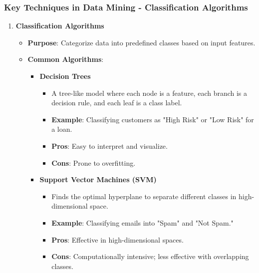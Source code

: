 \documentclass[aspectratio=169]{beamer}
\begin{document}
\begin{frame}[fragile]
    \frametitle{Key Techniques in Data Mining - Classification Algorithms}
    \begin{enumerate}
        \item \textbf{Classification Algorithms}
        \begin{itemize}
            \item \textbf{Purpose}: Categorize data into predefined classes based on input features.
            \item \textbf{Common Algorithms}:
            \begin{itemize}
                \item \textbf{Decision Trees}
                \begin{itemize}
                    \item A tree-like model where each node is a feature, each branch is a decision rule, and each leaf is a class label.
                    \item \textbf{Example}: Classifying customers as "High Risk" or "Low Risk" for a loan.
                    \item \textbf{Pros}: Easy to interpret and visualize.
                    \item \textbf{Cons}: Prone to overfitting.
                \end{itemize}
                
                \item \textbf{Support Vector Machines (SVM)}
                \begin{itemize}
                    \item Finds the optimal hyperplane to separate different classes in high-dimensional space.
                    \item \textbf{Example}: Classifying emails into "Spam" and "Not Spam."
                    \item \textbf{Pros}: Effective in high-dimensional spaces.
                    \item \textbf{Cons}: Computationally intensive; less effective with overlapping classes.
                \end{itemize}
            \end{itemize}
        \end{itemize}
    \end{enumerate}
\end{frame}
\end{document}
